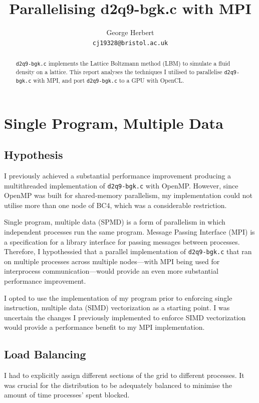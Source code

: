 \documentclass[twocolumn, a4paper]{article}
\author{
  George Herbert\\
  \texttt{cj19328@bristol.ac.uk}
}
\title{\vspace{-2em}Parallelising d2q9-bgk.c with MPI}
\begin{document}
\maketitle

\begin{abstract}
  \texttt{d2q9-bgk.c} implements the Lattice Boltzmann method (LBM) to simulate a fluid density on a lattice.
  This report analyses the techniques I utilised to parallelise \texttt{d2q9-bgk.c} with MPI, and port \texttt{d2q9-bgk.c} to a GPU with OpenCL.
\end{abstract}

\section{Single Program, Multiple Data}

\subsection{Hypothesis}

I previously achieved a substantial performance improvement producing a multithreaded implementation of \texttt{d2q9-bgk.c} with OpenMP.
However, since OpenMP was built for shared-memory parallelism, my implementation could not utilise more than one node of BC4, which was a considerable restriction.

Single program, multiple data (SPMD) is a form of parallelism in which independent processes run the same program.
Message Passing Interface (MPI) is a specification for a library interface for passing messages between processes.
Therefore, I hypothessied that a parallel implementation of \texttt{d2q9-bgk.c} that ran on multiple processes across multiple nodes---with MPI being used for interprocess communication---would provide an even more substantial performance improvement.

I opted to use the implementation of my program prior to enforcing single instruction, multiple data (SIMD) vectorization as a starting point.
I was uncertain the changes I previously implemented to enforce SIMD vectorization would provide a performance benefit to my MPI implementation.

\subsection{Load Balancing}

I had to explicitly assign different sections of the grid to different processes.
It was crucial for the distribution to be adequately balanced to minimise the amount of time processes' spent blocked.
\end{document}
